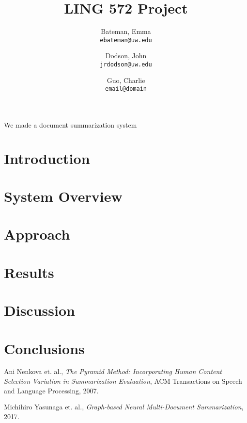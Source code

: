 \documentclass[11pt]{article}
\author{Bateman, Emma \\
  \texttt{ebateman@uw.edu}
  \and
  Dodson, John \\
  \texttt{jrdodson@uw.edu}
  \and
  Guo, Charlie \\
  \texttt{email@domain}}
\title{LING 572 Project}
\begin{document}
\maketitle

\abstract
We made a document summarization system

\section{Introduction}

\section{System Overview}

\section{Approach}

\section{Results}

\section{Discussion}

\section{Conclusions}

\begin{thebibliography}{11}
	Ani Nenkova et. al.,
	\textit{The Pyramid Method: Incorporating Human Content Selection Variation in Summarization Evaluation},
	ACM Transactions on Speech and Language Processing,
	2007.
	
	Michihiro Yasunaga et. al.,
	\textit{Graph-based Neural Multi-Document Summarization},
	2017.
	
\end{thebibliography}
\end{document}

